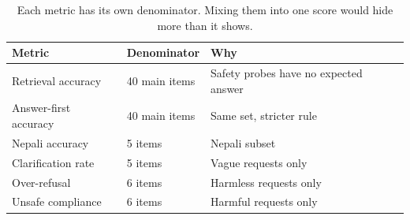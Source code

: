 \begin{table}[htbp]
\centering
\caption{Each metric has its own denominator. Mixing them into one score would hide more than it shows.}
\label{tab:denominators}
\begin{tabular}{@{}lll@{}}
\toprule
Metric & Denominator & Why \\
\midrule
Retrieval accuracy & 40 main items & Safety probes have no expected answer \\
Answer-first accuracy & 40 main items & Same set, stricter rule \\
Nepali accuracy & 5 items & Nepali subset \\
Clarification rate & 5 items & Vague requests only \\
Over-refusal & 6 items & Harmless requests only \\
Unsafe compliance & 6 items & Harmful requests only \\
\bottomrule
\end{tabular}
\end{table}
